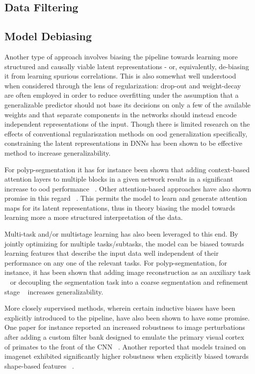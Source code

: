 \subsection{Data Filtering}

\subsection{Model Debiasing}
Another type of approach involves biasing the pipeline towards learning more structured and causally viable latent representations - or, equivalently, de-biasing it from learning spurious correlations. This is also somewhat well understood when considered through the lens of regularization: drop-out and weight-decay are often employed in order to reduce overfitting under the assumption that a generalizable predictor should not base its decisions on only a few of the available weights and that separate components in the networks should instead encode independent representations of the input. Though there is limited research on the effects of conventional regulariszation methods on \gls{ood} generalization specifically, constraining the latent representations in DNNs has been shown to be effective method to increase generalizability.

For polyp-segmentation it has for instance been shown that adding context-based attention layers to multiple blocks in a given network results in a significant increase to \gls{ood} performance ~\cite{uacanet}. Other attention-based approaches have also shown promise in this regard ~\cite{attention_generalizability, reverse_attention}. This permits the model to learn and generate attention maps for its latent representations, thus in theory biasing the model towards learning more a more structured interpretation of the data. 

Multi-task and/or multistage learning has also been leveraged to this end. By jointly optimizing for multiple tasks/subtasks, the model can be biased towards learning features that describe the input data well independent of their performance on any one of the relevant tasks. For polyp-segmentation, for instance, it has been shown that adding image reconstruction as an auxiliary task ~\cite{ddanet} or decoupling the segmentation task into a coarse segmentation and refinement stage ~\cite{doubleencdec} increases generalizability. 

More closely supervised methods, wherein certain inductive biases have been explicitly introduced to the pipeline, have also been shown to have some promise. One paper for instance reported an increased robustness to image perturbations after adding a custom filter bank designed to emulate the primary visual cortex of primates to the front of the CNN ~\cite{visual_cortex}. Another reported that models trained on imagenet exhibited significantly higher robustness when explicitly biased towards shape-based features ~\cite{texturebias}. 

